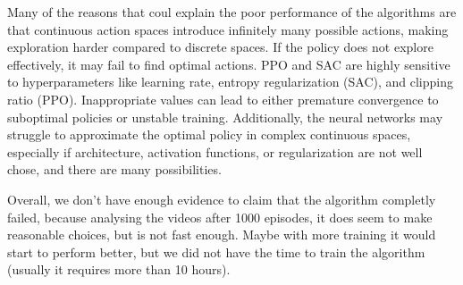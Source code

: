 \documentclass[../CSC_52081_EP.tex]{subfiles}
\begin{document}

Many of the reasons that coul explain the poor performance of the algorithms are that continuous action spaces introduce infinitely many possible actions, making exploration harder compared to discrete spaces. If the policy does not explore effectively, it may fail to find optimal actions.
PPO and SAC are highly sensitive to hyperparameters like learning rate, entropy regularization (SAC), and clipping ratio (PPO). Inappropriate values can lead to either premature convergence to suboptimal policies or unstable training.
Additionally, the neural networks may struggle to approximate the optimal policy in complex continuous spaces, especially if architecture, activation functions, or regularization are not well chose, and there are many possibilities.

Overall, we don't have enough evidence to claim that the algorithm completly failed, because analysing the videos after 1000 episodes, it does seem to make reasonable choices, but is not fast enough. Maybe with more training it would start to perform better, but we did not have the time to train the algorithm (usually it requires more than 10 hours).
\end{document}
